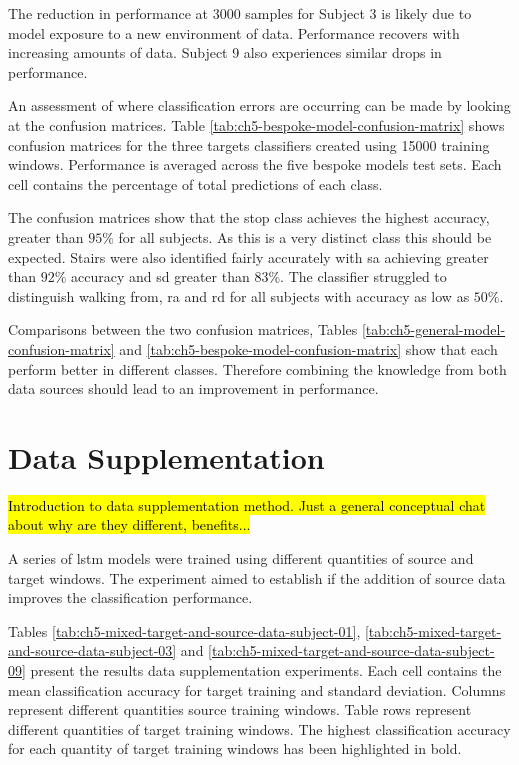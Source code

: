 The reduction in performance at 3000 samples for Subject 3 is likely due to model exposure to a new environment of data. Performance recovers with increasing amounts of data. Subject 9 also experiences similar drops in performance.

An assessment of where classification errors are occurring can be made by looking at the confusion matrices. Table \ref{tab:ch5-bespoke-model-confusion-matrix} shows confusion matrices for the three targets classifiers created using 15000 training windows. Performance is averaged across the five bespoke models test sets. Each cell contains the percentage of total predictions of each class.

The confusion matrices show that the stop class achieves the highest accuracy, greater than $95\%$ for all subjects. As this is a very distinct class this should be expected. Stairs were also identified fairly accurately with \acrlong{sa} achieving greater than $92\%$ accuracy and \acrlong{sd} greater than $83\%$. The classifier struggled to distinguish walking from, \acrlong{ra} and \acrlong{rd} for all subjects with accuracy as low as $50\%$. 

Comparisons between the two confusion matrices, Tables \ref{tab:ch5-general-model-confusion-matrix} and \ref{tab:ch5-bespoke-model-confusion-matrix} show that each perform better in different classes. Therefore combining the knowledge from both data sources should lead to an improvement in performance.


\section{Data Supplementation}
\label{sec:model-personalisation-results-supplementation}
\hl{Introduction to data supplementation method. Just a general conceptual chat about why are they different, benefits...}

A series of \acrshort{lstm} models were trained using different quantities of source and target windows. The experiment aimed to establish if the addition of source data improves the classification performance.

Tables \ref{tab:ch5-mixed-target-and-source-data-subject-01}, \ref{tab:ch5-mixed-target-and-source-data-subject-03} and \ref{tab:ch5-mixed-target-and-source-data-subject-09} present the results data supplementation experiments. Each cell contains the mean classification accuracy for target training and standard deviation. Columns represent different quantities source training windows. Table rows represent different quantities of target training windows. The highest classification accuracy for each quantity of target training windows has been highlighted in bold.

